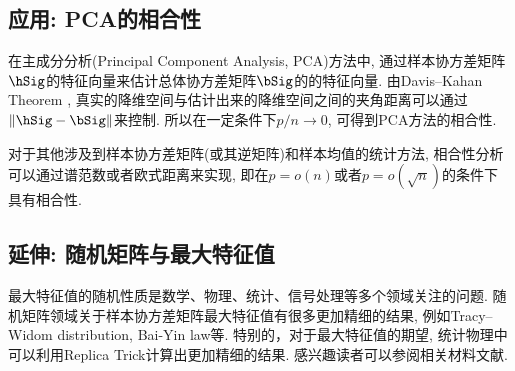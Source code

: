 \subsection{应用: PCA的相合性}
在主成分分析(Principal Component Analysis, PCA)方法中, 通过样本协方差矩阵$\hSig$的特征向量来估计总体协方差矩阵$\bSig$的的特征向量. 由Davis–Kahan Theorem \citep{yu2015useful}, 真实的降维空间与估计出来的降维空间之间的夹角距离可以通过$\|\hSig-\bSig\|$来控制. 所以在一定条件下$p/n \to 0$, 可得到PCA方法的相合性. 

对于其他涉及到样本协方差矩阵(或其逆矩阵)和样本均值的统计方法, 相合性分析可以通过谱范数或者欧式距离来实现, 即在$p=o(n)$或者$p=o(\sqrt{n})$的条件下具有相合性.

\subsection{延伸: 随机矩阵与最大特征值}
最大特征值的随机性质是数学、物理、统计、信号处理等多个领域关注的问题. 随机矩阵领域关于样本协方差矩阵最大特征值有很多更加精细的结果, 例如Tracy–Widom distribution, Bai-Yin law等. 特别的，对于最大特征值的期望, 统计物理中可以利用Replica Trick计算出更加精细的结果. 感兴趣读者可以参阅相关材料文献. 